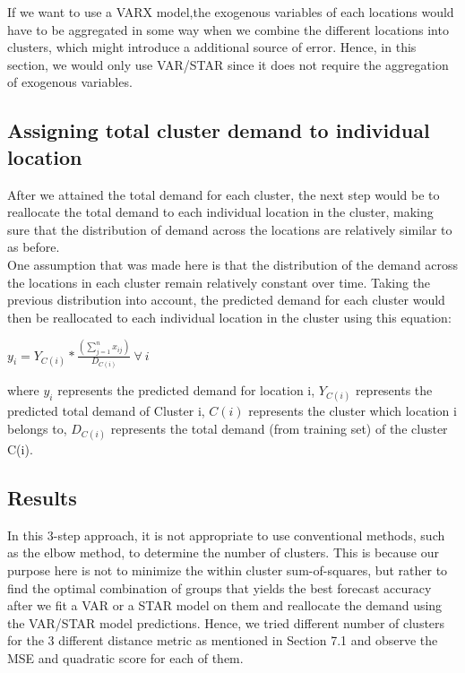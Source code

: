 \documentclass[nonblindrev,msom]{informs3} %
\begin{document}
\noindent If we want to use a VARX model,the exogenous variables of each locations would have to be aggregated in some way when we combine the different locations into clusters, which might introduce a additional source of error. Hence, in this section, we would only use VAR/STAR since it does not require the aggregation of exogenous variables.


\subsection{Assigning total cluster demand to individual location}

After we attained the total demand for each cluster, the next step would be to reallocate the total demand to each individual location in the cluster, making sure that the distribution of demand across the locations are relatively similar to as before. \\

\noindent One assumption that was made here is that the distribution of the demand across the locations in each cluster remain relatively constant over time. Taking the previous distribution into account, the predicted demand for each cluster would then be reallocated to each individual location in the cluster using this equation:

\begin{center}
    $\displaystyle y_{i} = Y_{C(i)} * \frac{(\sum_{j=1}^{n}x_{ij})}{D_{C(i)}} \: \forall \: i$
\end{center}

\noindent where $y_i$ represents the predicted demand for location i, $Y_{C(i)}$ represents the predicted total demand of Cluster i, $C(i)$ represents the cluster which location i belongs to, $D_{C(i)}$ represents the total demand (from training set) of the cluster C(i).


\subsection{Results}

In this 3-step approach, it is not appropriate to use conventional methods, such as the elbow method, to determine the number of clusters. This is because our purpose here is not to minimize the within cluster sum-of-squares, but rather to find the optimal combination of groups that yields the best forecast accuracy after we fit a VAR or a STAR model on them and reallocate the demand using the VAR/STAR model predictions. Hence, we tried different number of clusters for the 3 different distance metric as mentioned in Section 7.1 and observe the MSE and quadratic score for each of them.
\end{document}
